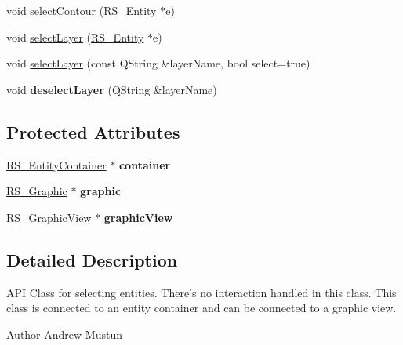 \begin{DoxyCompactItemize}
\item 
void \hyperlink{classRS__Selection_a0a9ca8b1acd423859d4ea456fad0529d}{select\-Contour} (\hyperlink{classRS__Entity}{R\-S\-\_\-\-Entity} $\ast$e)
\item 
void \hyperlink{classRS__Selection_a355b64f020d45e186e0809c3328d1d73}{select\-Layer} (\hyperlink{classRS__Entity}{R\-S\-\_\-\-Entity} $\ast$e)
\item 
void \hyperlink{classRS__Selection_acbe12b1795a448641415163ab0854771}{select\-Layer} (const Q\-String \&layer\-Name, bool select=true)
\item 
\hypertarget{classRS__Selection_ab8ebe7f49405dfdfcabee8f547ddea0f}{void {\bfseries deselect\-Layer} (Q\-String \&layer\-Name)}\label{classRS__Selection_ab8ebe7f49405dfdfcabee8f547ddea0f}

\end{DoxyCompactItemize}
\subsection*{Protected Attributes}
\begin{DoxyCompactItemize}
\item 
\hypertarget{classRS__Selection_acfd42e8489000fa8b8fb7eaf5e6031aa}{\hyperlink{classRS__EntityContainer}{R\-S\-\_\-\-Entity\-Container} $\ast$ {\bfseries container}}\label{classRS__Selection_acfd42e8489000fa8b8fb7eaf5e6031aa}

\item 
\hypertarget{classRS__Selection_a1de18b76d0672236577403698cdb4023}{\hyperlink{classRS__Graphic}{R\-S\-\_\-\-Graphic} $\ast$ {\bfseries graphic}}\label{classRS__Selection_a1de18b76d0672236577403698cdb4023}

\item 
\hypertarget{classRS__Selection_afe1b36bfc012da6ec41b9e7a8ce4c31a}{\hyperlink{classRS__GraphicView}{R\-S\-\_\-\-Graphic\-View} $\ast$ {\bfseries graphic\-View}}\label{classRS__Selection_afe1b36bfc012da6ec41b9e7a8ce4c31a}

\end{DoxyCompactItemize}


\subsection{Detailed Description}
A\-P\-I Class for selecting entities. There's no interaction handled in this class. This class is connected to an entity container and can be connected to a graphic view.

\begin{DoxyAuthor}{Author}
Andrew Mustun 
\end{DoxyAuthor}


